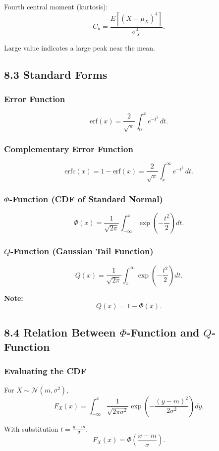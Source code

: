 \documentclass[11pt]{article}
\begin{document}
Fourth central moment (kurtosis):
\[
C_k=\frac{E[(X-\mu_X)^4]}{\sigma_X^4}.
\]

Large value indicates a large peak near the mean.

\subsection*{8.3 Standard Forms}

\subsubsection*{Error Function}
\[
\mathrm{erf}(x)=\frac{2}{\sqrt{\pi}}\int_0^x e^{-t^2}\,dt.
\]

\subsubsection*{Complementary Error Function}
\[
\mathrm{erfc}(x)=1-\mathrm{erf}(x)
=\frac{2}{\sqrt{\pi}}\int_x^\infty e^{-t^2}\,dt.
\]

\subsubsection*{$\Phi$-Function (CDF of Standard Normal)}
\[
\Phi(x)=\frac{1}{\sqrt{2\pi}}
\int_{-\infty}^{x}\exp\!\left(-\frac{t^2}{2}\right)dt.
\]

\subsubsection*{$Q$-Function (Gaussian Tail Function)}
\[
Q(x)=\frac{1}{\sqrt{2\pi}}
\int_x^{\infty}\exp\!\left(-\frac{t^2}{2}\right)dt.
\]

\textbf{Note:}
\[
Q(x)=1-\Phi(x).
\]

\subsection*{8.4 Relation Between $\Phi$-Function and $Q$-Function}

\subsubsection*{Evaluating the CDF}

For $X\sim\mathcal N(m,\sigma^2)$,
\[
F_X(x)=\int_{-\infty}^{x}
\frac{1}{\sqrt{2\pi\sigma^2}}
\exp\!\left(-\frac{(y-m)^2}{2\sigma^2}\right)dy.
\]

With substitution $t=\frac{y-m}{\sigma}$,
\[
F_X(x)=\Phi\!\left(\frac{x-m}{\sigma}\right).
\]
\end{document}
